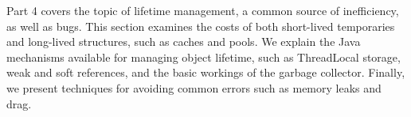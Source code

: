 Part 4 covers the topic of lifetime management, a common source of inefficiency,
as well as bugs. This section examines the costs of both short-lived temporaries
and long-lived structures, such as caches and pools.  We explain the Java
mechanisms available for managing object lifetime, such as ThreadLocal storage,
weak and soft references, and the basic workings of the garbage collector.
Finally, we present techniques for avoiding common errors such as memory leaks
and drag. %

